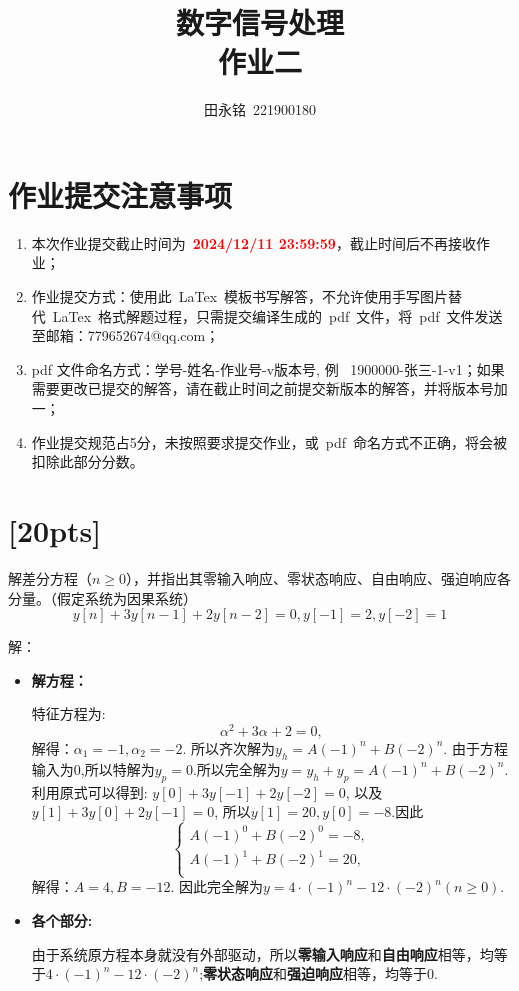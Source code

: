 \documentclass[a4paper,UTF8]{article}
\numberwithin{equation}{section}
\begin{document}
\title{数字信号处理\\
    作业二}
\author{田永铭\, 221900180}
\maketitle

\section*{作业提交注意事项}
\begin{tcolorbox}
    \begin{enumerate}
       \item[(1)] 本次作业提交截止时间为~\textcolor{red}{\textbf{2024/12/11  23:59:59}}，截止时间后不再接收作业；
        \item[(2)] 作业提交方式：使用此~LaTex~模板书写解答，不允许使用手写图片替代~LaTex~格式解题过程，只需提交编译生成的~pdf~文件，将~pdf~文件发送至邮箱：779652674@qq.com；
        \item[(3)] pdf 文件命名方式：学号-姓名-作业号-v版本号, 例~ 1900000-张三-1-v1；如果需要更改已提交的解答，请在截止时间之前提交新版本的解答，并将版本号加一；
        \item[(4)] 作业提交规范占5分，未按照要求提交作业，或~pdf~命名方式不正确，将会被扣除此部分分数。
    \end{enumerate}
\end{tcolorbox}

\newpage
\section{[20pts]}
解差分方程（$n\ge 0$），并指出其零输入响应、零状态响应、自由响应、强迫响应各分量。（假定系统为因果系统）
$$y[n]+3y[n-1]+2y[n-2]=0,y[-1]=2,y[-2]=1$$

\begin{framed}
	   	解：
   \begin{itemize}
		\item \textbf{解方程：}
		
	特征方程为:
	\[
	\alpha^2 + 3\alpha + 2 = 0,
	\]
	解得：$\alpha_1 = -1,\alpha_2 = -2$.
	所以齐次解为$y_h = A(-1)^n + B(-2)^n$.
	由于方程输入为$0$,所以特解为$y_p = 0$.所以完全解为$y = y_h + y_p = A(-1)^n + B(-2)^n$.
	利用原式可以得到: $y[0] + 3y[-1] + 2y[-2] = 0$, 以及 $y[1]+3y[0] + 2y[-1] = 0$, 所以$y[1] = 20, y[0] = -8.$因此
	$$
	\begin{cases}
		A(-1)^0+ B(-2)^0 = -8,\\
		A(-1)^1+ B(-2)^1 = 20,\\
	\end{cases}
	$$解得：$A = 4, B = -12$.
	因此完全解为$y = 4\cdot(-1)^n - 12\cdot(-2)^n(n \geq 0).$
	
	\item \textbf{各个部分:}
	
	由于系统原方程本身就没有外部驱动，所以\textbf{零输入响应}和\textbf{自由响应}相等，均等于$4\cdot(-1)^n - 12\cdot(-2)^n$;\textbf{零状态响应}和\textbf{强迫响应}相等，均等于$0$.
   \end{itemize}
\end{framed}
\end{document}
